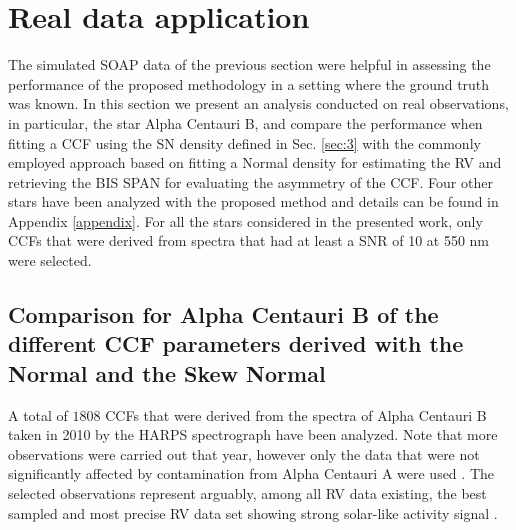 \documentclass{aa}
\begin{document}
\section{Real data application} \label{sec:4}

The simulated SOAP data of the previous section were helpful in assessing the performance of the proposed methodology in a setting where the ground truth was known.  In this section we present an analysis conducted on real observations, in particular, the star Alpha Centauri B, and compare the performance when fitting a CCF using the SN density defined in Sec. \ref{sec:3} with the commonly employed approach based on fitting a Normal density for estimating the RV and retrieving the BIS SPAN for evaluating the asymmetry of the CCF. 
Four other stars have been analyzed with the proposed method and details can be found in Appendix \ref{appendix}. 
For all the stars considered in the presented work, only CCFs that were derived from spectra that had at least a SNR of 10 at 550 nm were selected. 


\subsection{Comparison for Alpha Centauri B of the different CCF parameters derived with the Normal and the Skew Normal} \label{sec:alphacentb}

A total of $1808$ CCFs that were derived from the spectra of Alpha Centauri B taken in 2010 by the HARPS spectrograph have been analyzed. Note that more observations were carried out that year, however only the data that were not significantly affected by contamination from Alpha Centauri A were used \citep[see][]{Dumusque-2012}. 
The selected observations represent arguably, among all RV data existing, the best sampled and most precise RV data set showing strong solar-like activity signal \citep{Thompson-2017, Dumusque-2012}.
\end{document}
